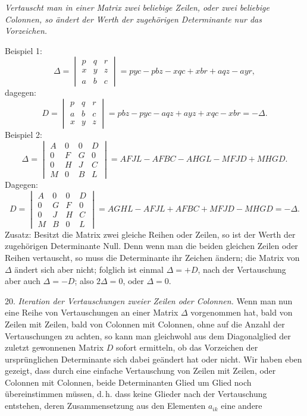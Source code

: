 \documentclass[11pt]{article}
\providecommand{\weberpage}[1]{}
\begin{document}
\weberpage{26}
\glqq\textit{Vertauscht man in einer Matrix zwei beliebige Zeilen, oder zwei beliebige Colonnen, so \"andert der Werth der zugeh\"origen Determinante nur das Vorzeichen.}\grqq{}

Beispiel 1:
\[
\varDelta = \begin{vmatrix} p & q & r \\ x & y & z \\ a & b & c \end{vmatrix} = pyc - pbz - xqc + xbr + aqz - ayr,
\]
dagegen:
\[
D = \begin{vmatrix} p & q & r \\ a & b & c \\ x & y & z \end{vmatrix} = pbz - pyc - aqz + ayz + xqc - xbr = - \varDelta.
\]
Beispiel 2:
\[
\varDelta = \begin{vmatrix} A & 0 & 0 & D \\ 0 & F & G & 0 \\ 0 & H & J & C \\ M & 0 & B & L \end{vmatrix} = AFJL - AFBC - AHGL - MFJD + MHGD.
\]
Dagegen:
\[
D = \begin{vmatrix} A & 0 & 0 & D \\ 0 & G & F & 0 \\ 0 & J & H & C \\ M & B & 0 & L \end{vmatrix} = AGHL - AFJL + AFBC + MFJD - MHGD = - \varDelta.
\]
Zusatz: \glqq Besitzt die Matrix zwei gleiche Reihen oder Zeilen, so ist der Werth der zugeh\"origen Determinante Null.\grqq{} Denn wenn man die beiden gleichen Zeilen oder Reihen vertauscht, so muss die Determinante ihr Zeichen \"andern; die Matrix von $\varDelta$ \"andert sich aber nicht; folglich ist einmal $\varDelta = + D$, nach der Vertauschung aber auch $\varDelta = - D$; also $2 \varDelta = 0$, oder $\varDelta = 0$.

20. \textit{Iteration der Vertauschungen zweier Zeilen oder Colonnen.} Wenn man nun eine Reihe von Vertauschungen an einer Matrix $\varDelta$ vorgenommen hat, bald von Zeilen mit Zeilen, bald von Colonnen mit Colonnen, ohne auf die Anzahl der Vertauschungen zu achten, so kann man gleichwohl aus dem Diagonalglied der zuletzt gewonnenen Matrix $D$ sofort ermitteln, ob das Vorzeichen der urspr\"unglichen Determinante sich dabei ge\"andert hat oder nicht. Wir haben eben gezeigt, dass durch eine einfache Vertauschung von Zeilen mit Zeilen, oder Colonnen mit Colonnen, beide Determinanten Glied um Glied noch \"ubereinstimmen m\"ussen, d.\,h. dass keine Glieder nach der Vertauschung entstehen, deren Zusammensetzung aus den Elementen $a_{ik}$ eine andere
\end{document}
